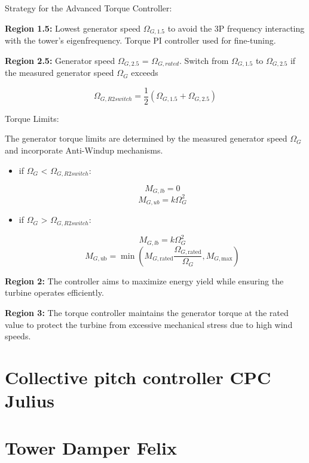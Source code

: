 Strategy for the Advanced Torque Controller:

\textbf{Region 1.5:} Lowest generator speed $\Omega_{G,1.5}$ to avoid the 3P frequency interacting with the tower's eigenfrequency. Torque PI controller used for fine-tuning.

\textbf{Region 2.5:} Generator speed $\Omega_{G,2.5}$ = $\Omega_{G,rated}$.
Switch from $\Omega_{G,1.5}$ to $\Omega_{G,2.5}$ if the measured generator speed $\Omega_{G}$ exceeds 

\begin{equation}
	\Omega_{G,R2switch} = \frac{1}{2} (\Omega_{G,1.5} + \Omega_{G,2.5})
\end{equation}

Torque Limits: 

The generator torque limits are determined by the measured generator speed $\Omega_{G}$ and incorporate Anti-Windup mechanisms.

\begin{itemize}
	
	\item if $\Omega_{G}$ < $\Omega_{G,R2switch}$:
	
	\begin{equation}
		M_{G,lb} = 0
	\end{equation}
	\begin{equation}
		M_{G,ub} = k \Omega_{G}^2
	\end{equation}
	
	\item if $\Omega_{G}$ > $\Omega_{G,R2switch}$:
	
	\begin{equation}
		M_{G,lb} = k \Omega_{G}^2
	\end{equation}
	\begin{equation} M_{G,\text{ub}} = \min\left(M_{G,\text{rated}} \frac{\Omega_{G,\text{rated}}}{\Omega_{G}}, M_{G,\text{max}}\right) \end{equation}
	
\end{itemize}


\textbf{Region 2:} The controller aims to maximize energy yield while ensuring the turbine operates efficiently.

\textbf{Region 3:} The torque controller maintains the generator torque at the rated value to protect the turbine from excessive mechanical stress due to high wind speeds.

\section{Collective pitch controller CPC Julius}

\section{Tower Damper Felix}